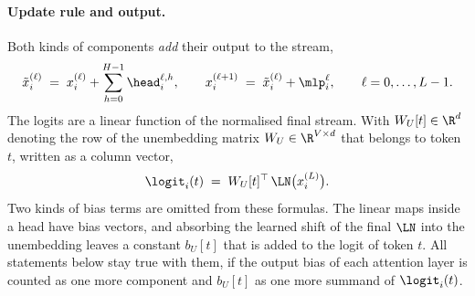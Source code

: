 \paragraph{Update rule and output.} Both kinds of components \emph{add} their output to the stream,
\begin{equation}\label{eq:update}
\tilde x_i^{(\ell)} \;=\; x_i^{(\ell)}+\sum_{h=0}^{H-1}\head_i^{\ell,h},\qquad
x_i^{(\ell+1)} \;=\; \tilde x_i^{(\ell)}+\mlp_i^{\ell},\qquad \ell=0,\dots,L-1 .
\end{equation}
The logits are a linear function of the normalised final stream. With $W_U[t]\in\R^d$ denoting the row of the
unembedding matrix $W_U\in\R^{V\times d}$ that belongs to token $t$, written as a column vector,
\begin{equation}\label{eq:unembed}
\logit_i(t) \;=\; W_U[t]^\top\,\LN\big(x_i^{(L)}\big).
\end{equation}
Two kinds of bias terms are omitted from these formulas. The linear maps inside a head have bias vectors, and
absorbing the learned shift of the final $\LN$ into the unembedding leaves a constant $b_U[t]$ that is added to the
logit of token $t$. All statements below stay true with them, if the output bias of each attention layer is counted
as one more component and $b_U[t]$ as one more summand of $\logit_i(t)$.

